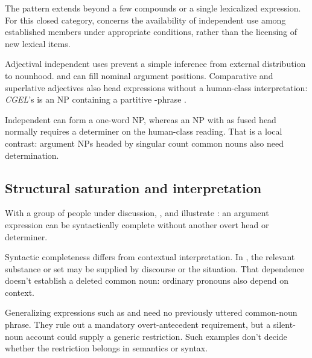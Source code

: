 \documentclass[12pt]{article}
\begin{document}
\ea\label{ex:external}
\ea {}\qquad {}\qquad {}
\ex {}\qquad {}\qquad {}
\ex {}\qquad {}\qquad {}
\ex {}\qquad {}\qquad {}
\z\z

The pattern extends beyond a few compounds or a single lexicalized expression. For this closed category,  concerns the availability of independent use among established members under appropriate conditions, rather than the licensing of new lexical items.

Adjectival independent uses prevent a simple inference from external distribution to nounhood.  and  can fill nominal argument positions. Comparative and superlative adjectives also head expressions without a human-class interpretation: \textit{CGEL}'s  is an NP containing a partitive -phrase \citep[332--333, 416--423]{huddleston2002}.

Independent  can form a one-word NP, whereas an NP with  as fused head normally requires a determiner on the human-class reading. That is a local contrast: argument NPs headed by singular count common nouns also need determination.

\subsection{Structural saturation and interpretation}

With a group of people under discussion, ,  and  illustrate : an argument expression can be syntactically complete without another overt head or determiner.

Syntactic completeness differs from contextual interpretation. In , the relevant substance or set may be supplied by discourse or the situation. That dependence doesn't establish a deleted common noun: ordinary pronouns also depend on context.

Generalizing expressions such as  and  need no previously uttered common-noun phrase. They rule out a mandatory overt-antecedent requirement, but a silent-noun account could supply a generic restriction. Such examples don't decide whether the restriction belongs in semantics or syntax.
\end{document}
